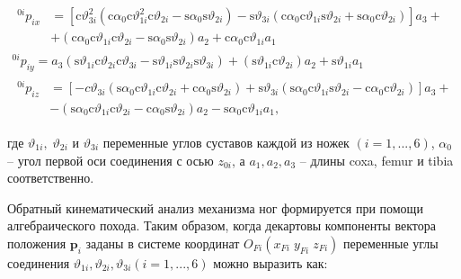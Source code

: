 \begin{equation}
\begin{array}{l}
	\begin{aligned}
		^{0 i} p_{i x} &=\left[\mathrm{c} \vartheta_{3 i}^{2}\left(\mathrm{c} \alpha_{0} \mathrm{c} \vartheta_{1 i}^{2} \mathrm{c} \vartheta_{2 i}-\mathrm{s} \alpha_{0} \mathrm{s} \vartheta_{2 i}\right)-\mathrm{s} \vartheta_{3 i}\left(\mathrm{c} \alpha_{0} \mathrm{c} \vartheta_{1 i} \mathrm{s} \vartheta_{2 i}+\mathrm{s} \alpha_{0} \mathrm{c} \vartheta_{2 i}\right)\right] a_{3}+\\
		&+\left(\mathrm{c} \alpha_{0} \mathrm{c} \vartheta_{1 i} \mathrm{c} \vartheta_{2 i}-\mathrm{s} \alpha_{0} \mathrm{s} \vartheta_{2 i}\right) a_{2}+\mathrm{c} \alpha_{0} \mathrm{c} \vartheta_{1 i} a_{1}
	\end{aligned}\\
	^{0 i} p_{i y}=a_{3}\left(\mathrm{s} \vartheta_{1 i} \mathrm{c} \vartheta_{2 i} \mathrm{c} \vartheta_{3 i}-\mathrm{s} \vartheta_{1 i} \mathrm{s} \vartheta_{2 i} \mathrm{s} \vartheta_{3 i}\right)+\left(\mathrm{s} \vartheta_{1 i} \mathrm{c} \vartheta_{2 i}\right) a_{2}+\mathrm{s} \vartheta_{1 i} a_{1}\\
	\begin{aligned}
		^{0 i} p_{i z} &=\left[-c \vartheta_{3 i}\left(\mathrm{s} \alpha_{0} \mathrm{c} \vartheta_{1 i} \mathrm{c} \vartheta_{2 i}+\mathrm{c} \alpha_{0} \mathrm{s} \vartheta_{2 i}\right)+\mathrm{s} \vartheta_{3 i}\left(\mathrm{s} \alpha_{0} \mathrm{c} \vartheta_{1 i} \mathrm{s} \vartheta_{2 i}-\mathrm{c} \alpha_{0} \mathrm{c} \vartheta_{2 i}\right)\right] a_{3}+\\
		&-\left(\mathrm{s} \alpha_{0} \mathrm{c} \vartheta_{1 i} \mathrm{c} \vartheta_{2 i}-\mathrm{c} \alpha_{0} \mathrm{s} \vartheta_{2 i}\right) a_{2}-\mathrm{s} \alpha_{0} \mathrm{c} \vartheta_{1 i} a_{1},
	\end{aligned}
\end{array}
\end{equation}

где $\vartheta_{1i},\;\vartheta_{2i}$ и $\vartheta_{3i}$ переменные углов суставов  каждой из ножек $(i=1,...,6)$, $\alpha_0$ – угол первой оси соединения с осью $z_{0i}$, а $a_1, a_2, a_3$ – длины coxa, femur и tibia соответственно. 

Обратный кинематический анализ механизма ног формируется при помощи алгебраического похода. Таким образом, когда декартовы компоненты вектора положения $\mathbf{p}_i$ заданы в системе координат $O_{Fi}(x_{Fi}\;y_{Fi}\;z_{Fi})$ переменные углы соединения $\vartheta_{1i}, \vartheta_{2i}, \vartheta_{3i} (i=1,...,6)$ можно выразить как:

